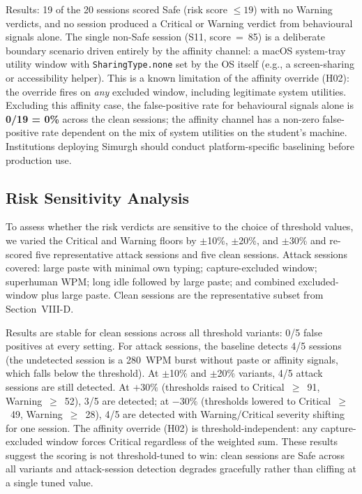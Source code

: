 \documentclass[conference]{IEEEtran}
\begin{document}
Results: 19 of the 20 sessions scored Safe (risk score $\leq 19$) with no Warning verdicts, and no session produced a Critical or Warning verdict from behavioural signals alone. The single non-Safe session (S11, score~=~85) is a deliberate boundary scenario driven entirely by the affinity channel: a macOS system-tray utility window with \texttt{SharingType.none} set by the OS itself (e.g., a screen-sharing or accessibility helper). This is a known limitation of the affinity override (H02): the override fires on \textit{any} excluded window, including legitimate system utilities. Excluding this affinity case, the false-positive rate for behavioural signals alone is \textbf{0/19 = 0\%} across the clean sessions; the affinity channel has a non-zero false-positive rate dependent on the mix of system utilities on the student's machine. Institutions deploying Simurgh should conduct platform-specific baselining before production use.

\subsection{Risk Sensitivity Analysis}

To assess whether the risk verdicts are sensitive to the choice of threshold values, we varied the Critical and Warning floors by $\pm$10\%, $\pm$20\%, and $\pm$30\% and re-scored five representative attack sessions and five clean sessions. Attack sessions covered: large paste with minimal own typing; capture-excluded window; superhuman WPM; long idle followed by large paste; and combined excluded-window plus large paste. Clean sessions are the representative subset from Section~VIII-D.

Results are stable for clean sessions across all threshold variants: 0/5 false positives at every setting. For attack sessions, the baseline detects 4/5 sessions (the undetected session is a 280~WPM burst without paste or affinity signals, which falls below the threshold). At $\pm$10\% and $\pm$20\% variants, 4/5 attack sessions are still detected. At $+30\%$ (thresholds raised to Critical~$\geq$~91, Warning~$\geq$~52), 3/5 are detected; at $-30\%$ (thresholds lowered to Critical~$\geq$~49, Warning~$\geq$~28), 4/5 are detected with Warning/Critical severity shifting for one session. The affinity override (H02) is threshold-independent: any capture-excluded window forces Critical regardless of the weighted sum. These results suggest the scoring is not threshold-tuned to win: clean sessions are Safe across all variants and attack-session detection degrades gracefully rather than cliffing at a single tuned value.
\end{document}
